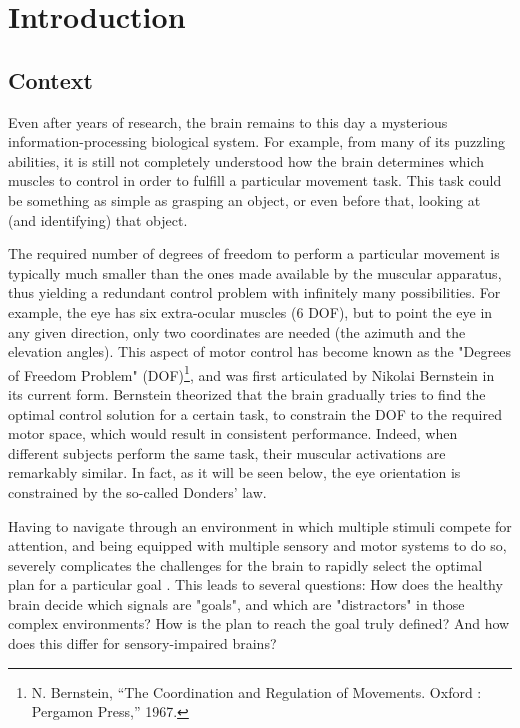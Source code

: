 
\chapter{Introduction}
\label{introduction}


\section{Context}
\label{cha1:context}
Even after years of research, the brain remains to this day a mysterious information-processing biological system. For example, from many of its puzzling abilities, it is still not completely understood how the brain determines which muscles to control in order to fulfill a particular movement task. This task could be something as simple as grasping an object, or even before that, looking at (and identifying) that  object.

The required number of degrees	 of freedom to perform a particular movement is typically much smaller than the ones made available by the muscular apparatus, thus yielding a redundant control problem with infinitely many possibilities. For example, the eye has six extra-ocular muscles (6 DOF), but to point the eye in any given direction, only two coordinates are needed (the azimuth and the elevation angles). This aspect of motor control has become known as the "Degrees of Freedom Problem" (DOF)\footnote{N. Bernstein, “The Coordination and Regulation of Movements. Oxford : Pergamon Press,” 1967.}, and was first articulated by Nikolai Bernstein in its current form. Bernstein theorized that the brain gradually tries to find the optimal control solution for a certain task, to constrain the DOF to the required motor space, which would result in consistent performance. Indeed, when different subjects perform the same task, their muscular activations are remarkably similar. In fact, as it will be seen below, the eye orientation is constrained by the so-called Donders' law.

Having to navigate through an environment in which multiple  stimuli compete for attention, and being equipped with multiple sensory and motor systems to do so, severely complicates the challenges for the brain to rapidly select the optimal plan for a particular goal \cite{johnpage}. This leads to several questions: How does the healthy brain decide which signals are "goals", and which are "distractors" in those complex environments? How is the plan to reach the goal truly defined? And how does this differ for sensory-impaired brains? 

